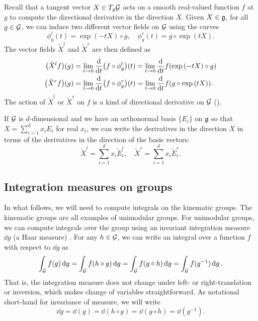 \documentclass[../../main.tex]{subfiles}
\begin{document}
\begin{refsection}
	Recall that a tangent vector $X \in T_g \mathcal{G}$ acts on a smooth real-valued function $f$ at $g$ to compute the directional derivative in the direction $X$.
	Given $X \in \mathfrak{g}$, for all $g \in \mathcal{G}$, we can induce two different vector fields on $\mathcal{G}$ using the curves
	$$\phi_g^l(t) = \exp(-t X) \circ g, \quad \phi_g^r(t) = g \circ \exp(t X).$$
	The vector fields $\tilde{X}^l$ and $\tilde{X}^r$ are then defined as
	\begin{align}\label{lie_directional_deriv}
		\qty(\tilde{X}^l f)(g) & = \lim_{t \to 0} \dv{t} \qty(f \circ \phi_g^l)(t) = \lim_{t \to 0} \dv{t} f\qty(\exp\qty(-t X) \circ g) \\
		\qty(\tilde{X}^r f)(g) & = \lim_{t \to 0} \dv{t} \qty(f \circ \phi_g^r)(t) = \lim_{t \to 0} \dv{t} f\qty(g \circ \exp\qty(t X)).
	\end{align}
	The action of $\tilde{X}^l$ or $\tilde{X}^r$ on $f$ is a kind of directional derivative on $\mathcal{G}$ (\cite[Section 8.3.3]{chirikjianHarmonicAnalysisEngineers2016}).

	If $\mathcal{G}$ is $d$-dimensional and we have an orthonormal basis $\{E_i\}$ on $\mathfrak{g}$ so that $X = \sum_{i=1}^d x_i E_i$ for real $x_i$, we can write the derivatives in the direction $X$ in terms of the derivatives in the direction of the basis vectors:
	\begin{equation}
		\tilde{X}^l = \sum_{i=1}^d x_i \tilde{E}_i^l, \quad \tilde{X}^r = \sum_{i=1}^d x_i \tilde{E}_i^r.
	\end{equation}

	\subsection{Integration measures on groups}\label{integration-measures-groups}

	In what follows, we will need to compute integrals on the kinematic groups.
	The kinematic groups are all examples of unimodular groups.
	For unimodular groups, we can compute integrals over the group using an invariant integration measure $\dd{g}$ (a Haar measure) \cite[Section 8.2]{chirikjianHarmonicAnalysisEngineers2016}.
	For any $h \in \mathcal{G}$, we can write an integral over a function $f$ with respect to $\dd{g}$ as
	$$\int_{\mathcal{G}} f(g) \dd{g} = \int_{\mathcal{G}} f(h \circ g) \dd{g} = \int_{\mathcal{G}} f(g \circ h) \dd{g} = \int_{\mathcal{G}} f(g^{-1}) \dd{g}.$$
	That is, the integration measure does not change under left- or right-translation or inversion, which makes change of variables straightforward.
	As notational short-hand for invariance of measure, we will write
	\begin{equation}\label{measure-identities}
		\dd{g} = \dd(g) = \dd(h \circ g) = \dd(g \circ h) = \dd(g^{-1}).
	\end{equation}


\end{refsection}
\end{document}
